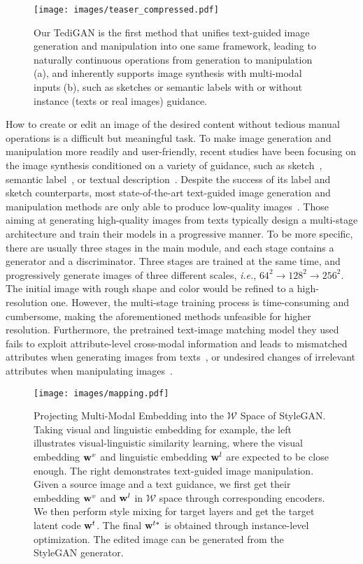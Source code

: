 \documentclass[final]{cvpr}
\newcommand{\w}{{\rm\bf w}}
\def\ie{\emph{i.e.}}
\begin{document}
\begin{figure}[th]
\centering
\texttt{[image: images/teaser\_compressed.pdf]}
\caption{Our TediGAN is the first method that unifies text-guided image generation and manipulation into one same framework, leading to naturally continuous operations from generation to manipulation (a), and inherently supports image synthesis with multi-modal inputs (b), such as sketches or semantic labels with or without instance (texts or real images) guidance.
}
\label{fig:teaser}
\end{figure}
How to create or edit an image of the desired content without tedious manual operations is a difficult but meaningful task.
To make image generation and manipulation more readily and user-friendly, recent studies have been focusing on the image synthesis conditioned on a variety of guidance, such as sketch~\cite{ghosh2019isketchnfill,xia2019sketch}, semantic label~\cite{isola2017image,wang2018high}, or textual description~\cite{nam2018tagan,xu2018attngan}.
Despite the success of its label and sketch counterparts, most state-of-the-art text-guided image generation and manipulation methods are only able to produce low-quality images~\cite{reed2016generative,dong2017semantic}. 
Those aiming at generating high-quality images from texts typically design a multi-stage architecture and train their models in a progressive manner. 
To be more specific, there are usually three stages in the main module, and each stage contains a generator and a discriminator. Three stages are trained at the same time, and progressively generate images of three different scales, \ie, \(\text{64}^2 \to \text{128}^2 \to \text{256}^2\).
The initial image with rough shape and color would be refined to a high-resolution one. 
However, the multi-stage training process is time-consuming and cumbersome, making the aforementioned methods unfeasible for higher resolution.
Furthermore, the pretrained text-image matching model they used fails to exploit attribute-level cross-modal information and leads to mismatched attributes when generating images from texts~\cite{xu2018attngan,li2019control,zhu2019dmgan,cheng2020rifegan}, or undesired changes of irrelevant attributes when manipulating images~\cite{dong2017semantic,nam2018tagan,li2020manigan,li2020lightweight}.

\begin{figure}[t]
\centering
\texttt{[image: images/mapping.pdf]}
\caption{{Projecting Multi-Modal Embedding into the $\mathcal{W}$ Space of StyleGAN.} 
Taking visual and linguistic embedding for example, the left illustrates visual-linguistic similarity learning, where the visual embedding $\w^v$ and linguistic embedding $\w^l$ are expected to be close enough. 
The right demonstrates text-guided image manipulation.
Given a source image and a text guidance, we first get their embedding $\w^v$ and $\w^l$ in $\mathcal{W}$ space through corresponding encoders. We then perform style mixing for target layers and get the target latent code $\w^t$. The final $\w^{t*}$ is obtained through instance-level optimization. The edited image can be generated from the StyleGAN generator.
}
\label{fig:mapping}
\end{figure}
\end{document}
